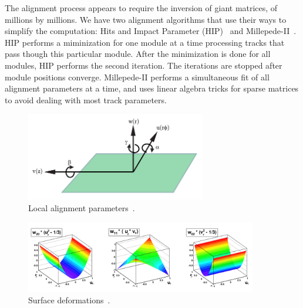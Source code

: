 

The alignment process appears to require the inversion of giant matrices, of millions by millions. We have two alignment algorithms that use their ways to simplify the computation: Hits and Impact Parameter (HIP)~\cite{ref_HIP_Alg} and Millepede-II~\cite{ref_MPII_Alg}. HIP performs a miminization for one module at a time processing tracks that pass though this particular module. After the minimization is done for all modules, HIP performs the second iteration. The iterations are stopped after module positions converge. Millepede-II performs a simultaneous fit of all alignment parameters at a time, and uses linear algebra tricks for sparse matrices to avoid dealing with most track parameters.

\begin{figure}[htb]
    \begin{center}
        \includegraphics[width=0.70\textwidth]{../figs/Alignment/alignment_strip_coords.png}
    \end{center}
    \caption{Local alignment parameters~\cite{ref_Frank_thesis}.}
    \label{fig:alignmentParameters}
\end{figure}

\begin{figure}[htb]
    \begin{center}
        \includegraphics[width=0.90\textwidth]{../figs/Alignment/alignment_surface_deformations.png}
    \end{center}
    \caption{Surface deformations~\cite{ref_Alignment}.}
    \label{fig:surfaceDeformations}
\end{figure}


